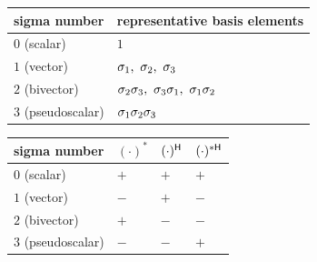 \begin{tableblock}
\captionsetup{type=table,font=normalsize,labelfont=bf,skip=4pt}
\label{tab:sigma-number-components}
\renewcommand{\arraystretch}{1.12}
\setlength{\tabcolsep}{4pt}
\normalsize
\begin{tabularx}{\columnwidth}{@{}l >{\raggedright\arraybackslash}X@{}}
\toprule
sigma number & representative basis elements \\
\midrule
\(0\) (scalar) & \(1\) \\
\(1\) (vector) & \(\pv{\sigma}_1,\ \pv{\sigma}_2,\ \pv{\sigma}_3\) \\
\(2\) (bivector) & \(\pv{\sigma}_2\pv{\sigma}_3,\ \pv{\sigma}_3\pv{\sigma}_1,\ \pv{\sigma}_1\pv{\sigma}_2\) \\
\(3\) (pseudoscalar) & \(\sigma_1\sigma_2\sigma_3\) \\
\bottomrule
\end{tabularx}
\end{tableblock}

\begin{tableblock}
\captionsetup{type=table,font=normalsize,labelfont=bf,skip=4pt}
\label{tab:sigma-number-signs}
\renewcommand{\arraystretch}{1.12}
\setlength{\tabcolsep}{4pt}
\normalsize
\begin{tabularx}{\columnwidth}{@{}l >{\raggedright\arraybackslash}X >{\raggedright\arraybackslash}X >{\raggedright\arraybackslash}X@{}}
\toprule
sigma number & \((\cdot)^*\) & \((\cdot)^{\mathsf H}\) & \((\cdot)^{*\mathsf H}\) \\
\midrule
\(0\) (scalar) & \(+\) & \(+\) & \(+\) \\
\(1\) (vector) & \(-\) & \(+\) & \(-\) \\
\(2\) (bivector) & \(+\) & \(-\) & \(-\) \\
\(3\) (pseudoscalar) & \(-\) & \(-\) & \(+\) \\
\bottomrule
\end{tabularx}
\end{tableblock}

